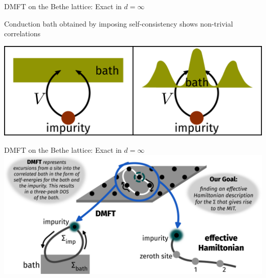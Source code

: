 \documentclass[8pt,aspectratio=169]{beamer}
\begin{document}
\begin{frame}{DMFT on the Bethe lattice: Exact in \(d=\infty\)}
\begin{itemize}
\begin{minipage}{0.4\textwidth}
\nitem Conduction bath obtained by imposing self-consistency shows \alert{non-trivial correlations}
\end{minipage}
\hspace*{\fill}
\begin{minipage}{0.45\textwidth}
\includegraphics[width=\textwidth]{dos_diff.pdf}
\end{minipage}
\end{itemize}
	
\end{frame}

\begin{frame}{DMFT on the Bethe lattice: Exact in \(d=\infty\)}
\centering
\hspace*{-20pt}\includegraphics[width=1.1\textwidth]{contrast2.pdf}
\end{frame}
\end{document}
